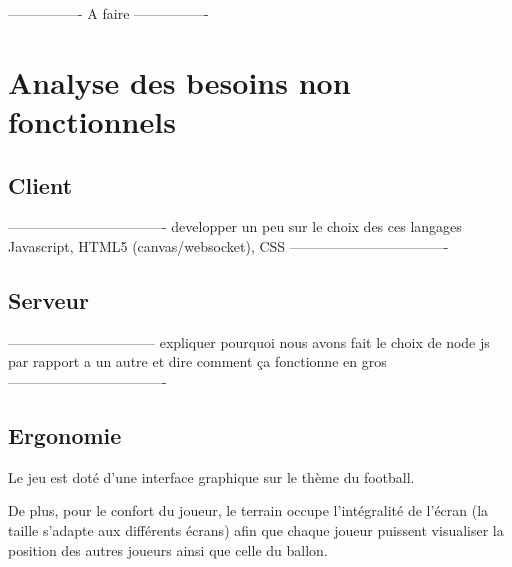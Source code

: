 ----------------
 A faire 
----------------

\section{Analyse des besoins non fonctionnels}

\subsection{Client}
----------------------------------
developper un peu sur le choix des ces langages
Javascript, HTML5 (canvas/websocket), CSS
----------------------------------

\subsection{Serveur}
--------------------------------
expliquer pourquoi nous avons fait le choix de node js par rapport a un autre et dire comment ça fonctionne en gros
----------------------------------

\subsection{Ergonomie}

Le jeu est doté d’une interface graphique sur le thème du football.

De plus, pour le confort du joueur, le terrain occupe l’intégralité de l’écran (la taille s’adapte aux différents écrans) afin que chaque joueur puissent visualiser la position des autres joueurs ainsi que celle du ballon.